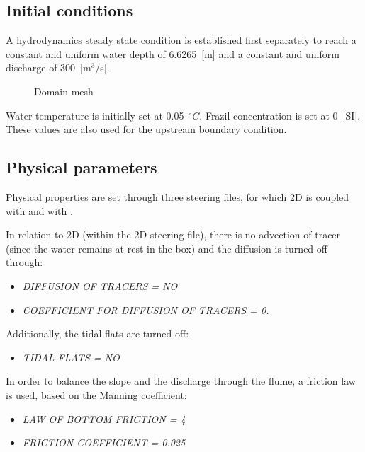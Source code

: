 \subsection{Initial conditions}
A hydrodynamics steady state condition is established first separately to reach a constant and uniform water depth of 6.6265~[m] and a constant and uniform discharge of 300~[m$^3$/s].\newline

\begin{figure}[H]
    \begin{center}
    \end{center}
    \caption{Domain mesh}
    \label{fig:growth_profile}
\end{figure}

Water temperature is initially set at 0.05~$^\circ C$. Frazil concentration is set at 0~[SI]. These values are also used for the upstream boundary condition.

%
\subsection{Physical parameters}
%
Physical properties are set through three steering files, for which \telemac2D is coupled with \waqtel and with \khione.

In relation to \telemac2D (within the \telemac2D steering file), there is no advection of tracer (since the water remains at rest in the box) and the diffusion is turned off through:
\begin{itemize}
\item\textit{DIFFUSION OF TRACERS = NO}
\item\textit{COEFFICIENT FOR DIFFUSION OF TRACERS = 0.}
\end{itemize}
Additionally, the tidal flats are turned off:
\begin{itemize}
    \item\textit{TIDAL FLATS = NO}
\end{itemize}
In order to balance the slope and the discharge through the flume, a friction law is used, based on the Manning coefficient:
\begin{itemize}
    \item\textit{LAW OF BOTTOM FRICTION = 4}
    \item\textit{FRICTION COEFFICIENT = 0.025}
\end{itemize}

